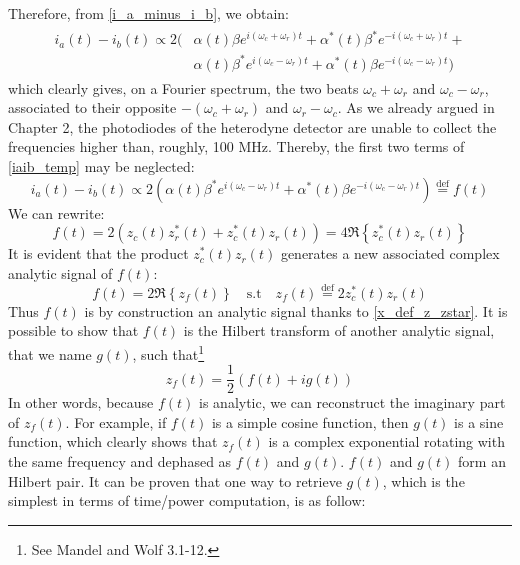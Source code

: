 \documentclass[11pt]{report}
\begin{document}
Therefore, from \eqref{i_a_minus_i_b}, we obtain:
\begin{align}
\begin{split}
\label{iaib_temp}
i_a(t) - i_b(t) \propto 2 ( &\alpha(t)\beta e^{i(\omega_c + \omega_r)t} + \alpha^*(t)\beta^* e^{-i(\omega_c + \omega_r)t} + \\
&\alpha(t)\beta^* e^{i(\omega_c - \omega_r)t} + \alpha^*(t)\beta e^{-i(\omega_c - \omega_r)t} )
\end{split}
\end{align}
which clearly gives, on a Fourier spectrum, the two beats $\omega_c + \omega_r$ and $\omega_c - \omega_r$, associated to their opposite $-(\omega_c + \omega_r)$ and $\omega_r - \omega_c$. As we already argued in Chapter 2, the photodiodes of the heterodyne detector are unable to collect the frequencies higher than, roughly, 100 MHz. Thereby, the first two terms of \eqref{iaib_temp} may be neglected:
\begin{equation}
i_a(t) - i_b(t) \propto 2 \left(\alpha(t)\beta^* e^{i(\omega_c - \omega_r)t} + \alpha^*(t)\beta e^{-i(\omega_c - \omega_r)t} \right) \stackrel{\text{def}}{=} f(t)
\end{equation}
We can rewrite:
\begin{equation}
f(t) = 2(z_c(t) z_r^*(t) + z_c^*(t) z_r(t)) = 4 \Re \left\lbrace z_c^*(t)z_r(t) \right\rbrace
\end{equation}
It is evident that the product $z_c^*(t)z_r(t)$ generates a new associated complex analytic signal of $f(t)$:
\begin{equation}
f(t) = 2\Re \left\lbrace z_f(t) \right\rbrace \quad \textrm{s.t} \quad z_f(t) \stackrel{\text{def}}{=} 2z_c^*(t)z_r(t)
\end{equation}
Thus $f(t)$ is by construction an analytic signal thanks to \eqref{x_def_z_zstar}. It is possible to show that $f(t)$ is the Hilbert transform of another analytic signal, that we name $g(t)$, such that\footnote{See Mandel and Wolf 3.1-12.}
\begin{equation}
\label{zf_eq_f_p_g}
z_f(t) = \frac{1}{2} \left( f(t) + i g(t) \right)
\end{equation}
In other words, because $f(t)$ is analytic, we can reconstruct the imaginary part of $z_f(t)$. For example, if $f(t)$ is a simple cosine function, then $g(t)$ is a sine function, which clearly shows that $z_f(t)$ is a complex exponential rotating with the same frequency and dephased as $f(t)$ and $g(t)$. $f(t)$ and $g(t)$ form an Hilbert pair. It can be proven that one way to retrieve $g(t)$, which is the simplest in terms of time/power computation, is as follow:
\end{document}
